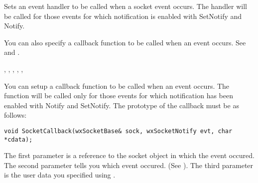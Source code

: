\label{wxsocketbaseseteventhandler}


Sets an event handler to be called when a socket event occurs. The handler
will be called for those events for which notification is enabled with
SetNotify and Notify.

You can also specify a callback function to be called when an event occurs.
See  and .





, 
, 
, 
, 
, 

\label{wxsocketbasecallback}


You can setup a callback function to be called when an event occurs. The function
will be called only for those events for which notification has been enabled
with Notify and SetNotify. The prototype of the callback must be as follows:

\begin{verbatim}
void SocketCallback(wxSocketBase& sock, wxSocketNotify evt, char *cdata);
\end{verbatim}

The first parameter is a reference to the socket object in which the event
occured. The second parameter tells you which event occured. (See ).
The third parameter is the user data you specified using .


